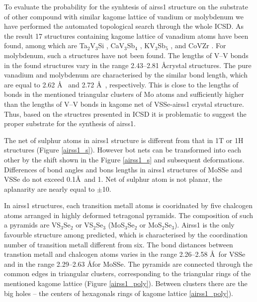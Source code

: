 \documentclass[a4paperm]{article}
\begin{document}
To evaluate the probability for the synhtesis of airss1 structure on the substrate of other compound with similar kagome lattice of vandium or molybdenum we have performed the automated topological search through the whole ICSD.
As the result 17 structures containing kagome lattice of vanadium atoms have been found, among which are Ta$_2$V$_3$Si \cite{Ta2V3Si}, CaV$_3$Sb$_4$ \cite{ CaV3Sb4}, KV$_3$Sb$_5$ \cite{KV3Sb5}, and CoVZr \cite{ZrVCO}.
For molybdenum, such a structures have not been found.
The lengths of V--V bonds in the found structures vary in the range 2.43--2.81 \AA  crystal structures.
The pure vanadium and molybdenum are characterised by the similar bond length, which are equal to 2.62 \AA\ \cite{vanadium} and 2.72 \AA\ \cite{molybdenum}, respectively.
This is close to the lengths of bonds in the mentioned triangular clusters of Mo atoms and sufficiently higher than the lengths of V--V bonds in kagome net of VSSe-airss1 crystal structure.
Thus, based on the structres presented in ICSD it is problematic to suggest the proper substrate for the synthesis of airss1.


The net of sulphur atoms in airss1 structure is different from that in 1T or 1H structures (Figure \ref{airss1_s}).
However bot nets can be transformed into each other by the shift shown in the Figure \ref{airss1_s} and subsequent deformations.
Differences of bond angles and bons lengths in airss1 structures of MoSSe and VSSe do not exceed 0.1\AA\ and 1\textdegree.
Net of sulphur atom is not planar, the aplanarity are nearly equal to $\pm$10\textdegree.

In airss1 structures, each transition metall atoms is cooridnated by five chalcogen atoms arranged in highly deformed tetragonal pyramids.
The composition of such a pyramids are VS$_3$Se$_2$ or VS$_2$Se$_3$ (MoS$_3$Se$_2$ or MoS$_2$Se$_3$).
Airss1 is the only favourble structure among predicted, which is characterised by the coordination number of transition metall different from six.
The bond distances between transtion metall and chalcogen atoms varies in the range 2.26--2.58 \AA\ for VSSe and in the range 2.29--2.63 \AA for MoSSe.
The pyramids are connected through the common edges in triangular clusters, corresponding to the triangular rings of the mentioned kagome lattice (Figure \ref{airss1_poly}).
Between clusters there are the big holes -- the centers of hexagonals rings of kagome lattice \ref{airss1_poly}).
\end{document}
